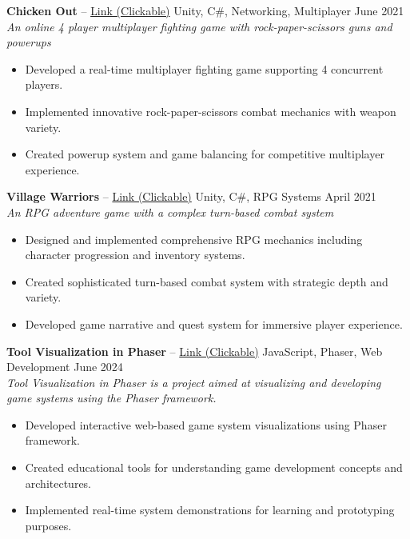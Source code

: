 \documentclass[a4paper,10pt]{article}
\begin{document}
\addvspace{\medskipamount} %

\textbf{Chicken Out} -- \href{https://assayyaad.itch.io/chicken-out}{Link (Clickable)} \hfill Unity, C\#, Networking, Multiplayer \hfill June 2021 \\
\textit{An online 4 player multiplayer fighting game with rock-paper-scissors guns and powerups}
\begin{itemize}[nosep]
    \item Developed a real-time multiplayer fighting game supporting 4 concurrent players.
    \item Implemented innovative rock-paper-scissors combat mechanics with weapon variety.
    \item Created powerup system and game balancing for competitive multiplayer experience.
\end{itemize}

\addvspace{\medskipamount} %

\textbf{Village Warriors} -- \href{https://assayyaad.itch.io/village-warriors}{Link (Clickable)} \hfill Unity, C\#, RPG Systems \hfill April 2021 \\
\textit{An RPG adventure game with a complex turn-based combat system}
\begin{itemize}[nosep]
    \item Designed and implemented comprehensive RPG mechanics including character progression and inventory systems.
    \item Created sophisticated turn-based combat system with strategic depth and variety.
    \item Developed game narrative and quest system for immersive player experience.
\end{itemize}

\addvspace{\medskipamount} %

\textbf{Tool Visualization in Phaser} -- \href{https://assayyaad.itch.io/anthima-phaser}{Link (Clickable)} \hfill JavaScript, Phaser, Web Development \hfill June 2024 \\
\textit{Tool Visualization in Phaser is a project aimed at visualizing and developing game systems using the Phaser framework.}
\begin{itemize}[nosep]
    \item Developed interactive web-based game system visualizations using Phaser framework.
    \item Created educational tools for understanding game development concepts and architectures.
    \item Implemented real-time system demonstrations for learning and prototyping purposes.
\end{itemize}
\end{document}

